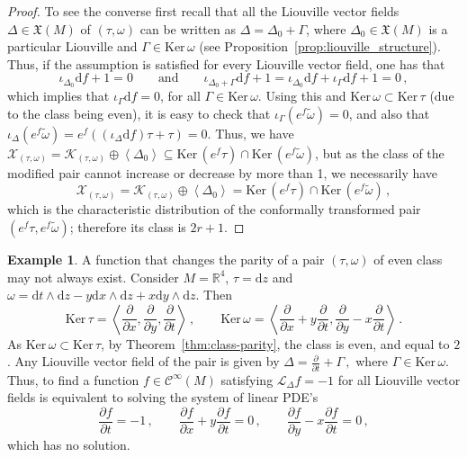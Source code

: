 \documentclass[11pt,twoside]{article}
\theoremstyle{plain}
\theoremstyle{definition}
\newtheorem{remark}[theorem]{Remark}
\newtheorem{example}[theorem]{Example}
\newcommand{\R}{\mathbb{R}}
\renewcommand{\d}{\mathrm{d}}
\newcommand{\Cinfty}{\mathscr{C}^\infty}
\newcommand*{\inn}[1]{\iota_{#1}}
\newcommand{\Lie}{\mathscr{L}}
\newcommand{\X}{\mathfrak{X}}
\def\d{\mathrm{d}}
\newcommand{\fracp}[2]{\frac{\partial #1}{\partial #2}}
\def\X{\mathfrak{X}}
\def\d{\mathrm{d}}
\def\Ker{\mathrm{Ker \,}}
\def\Lie{\mathscr{L}}
\def\K{\mathcal{K}}
\begin{document}
\begin{proof}
To see the converse first recall that all the Liouville vector fields $\Delta\in\X(M)$ of $(\tau,\omega)$
can be written as $\Delta = \Delta_0+\Gamma$, where $\Delta_0\in\X(M)$ is a particular Liouville and $\Gamma\in \Ker\omega$ (see Proposition~\ref{prop:liouville_structure}). Thus, if the assumption is satisfied for every Liouville vector field, one has that
$$\inn{\Delta_0}\d f+1=0\qquad \text{and} \qquad \inn{\Delta_0+\Gamma}\d f +1=\inn{\Delta_0}\d f+\inn{\Gamma}\d f+1=0\,,$$
which implies that 
$\inn{\Gamma}\d f = 0$,
for all $\Gamma \in \Ker\omega$. 
Using this and $\Ker\omega \subset \Ker \tau$ (due to the class being even), it is easy to check that
$\inn{\Gamma} (e^f\widetilde \omega) = 0$,
and also that
$ \inn{\Delta}(e^f\widetilde \omega) = e^f((\inn{\Delta} \d f)\tau + \tau) = 0$.
Thus, we have
$ \mathcal{X}_{(\tau,\omega)} =\K_{(\tau,\omega)} \oplus \left\langle \Delta_0 \right\rangle  \subseteq \Ker (e^f \tau )\cap \Ker (e^f\widetilde \omega)$,
but as the class of the modified pair cannot increase or decrease by more than 1, we necessarily have
$$\mathcal{X}_{(\tau,\omega)}=\K_{(\tau,\omega)} \oplus \left\langle \Delta_0 \right\rangle  = \Ker (e^f \tau )\cap \Ker (e^f\widetilde \omega)\,,$$
which is the characteristic distribution of the conformally transformed pair
$(e^f\tau,e^f\widetilde \omega)$;
therefore its class is $2r+1$.
\end{proof}



\begin{example}
    A function that changes the parity of a pair $(\tau,\omega)$ of even class may not always exist. 
    Consider $M = \R ^4$, $\tau= \d z$ and $\omega =  \d t\wedge \d z - y\d x\wedge \d z + x\d y\wedge \d z$. Then
    $$\Ker \tau= \left\langle \fracp{}{x} , \fracp{}{y},\fracp{}{t} \right \rangle\,,\qquad \Ker \omega= \left\langle \fracp{}{x} +y \fracp{}{t}, \fracp{}{y}-x\fracp{}{t} \right \rangle\,.$$
    As $\Ker \omega \subset \Ker \tau$, by Theorem~\ref{thm:class-parity}, the class is even, and equal to $2$. 
    Any Liouville vector field of the pair is given by
    $\Delta = \fracp{}{t} + \Gamma\,,$
    where $\Gamma \in \Ker \omega$. 
    Thus, to find a function $f \in \Cinfty(M)$ satisfying $\Lie_\Delta{f} = -1$ for all Liouville vector fields is equivalent to solving the system of linear PDE's
    $$ 
    \fracp{f}{t} = -1 \,,\qquad 
    \fracp{f}{x}+y\fracp{f}{t} = 0\,, \qquad 
    \fracp{f}{y}-x\fracp{f}{t} = 0\,,  
    $$
    which has no solution.
\end{example}
\end{document}
